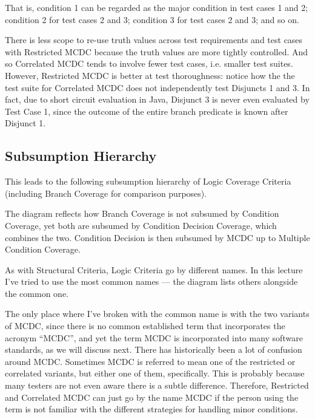 
That is, condition 1 can be regarded as the major condition in test cases
1 and 2; condition 2 for test cases 2 and 3; condition 3 for test
cases 2 and 3; and so on.

There is less scope to re-use truth values across test requirements and test
cases with Restricted MCDC because the truth values are more tightly controlled.
And so Correlated MCDC tends to involve fewer test cases, i.e. smaller test
suites. However, Restricted MCDC is better at test thoroughness: notice how the
the test suite for Correlated MCDC does not independently test Disjuncts 1 and
3. In fact, due to short circuit evaluation in Java, Disjunct 3 is never even
evaluated by Test Case 1, since the outcome of the entire branch predicate is
known after Disjunct 1.


\subsection{Subsumption Hierarchy}

This leads to the following subsumption hierarchy of Logic Coverage Criteria
(including Branch Coverage for comparison purposes).


The diagram reflects how Branch Coverage is not subsumed by Condition Coverage,
yet both are subsumed by Condition Decision Coverage, which combines the two.
Condition Decision is then subsumed by MCDC up to Multiple Condition Coverage.

As with Structural Criteria, Logic Criteria go by different names. In this
lecture I've tried to use the most common names --- the diagram lists others
alongside the common one. 

The only place where I've broken with the common name is with the two variants
of MCDC, since there is no common established term that incorporates the acronym
``MCDC'', and yet the term MCDC is incorporated into many software standards, as
we will discuss next.
%
There has historically been a lot of confusion around MCDC. Sometimes MCDC is
referred to mean one of the restricted or correlated variants, but either one of
them, specifically. This is probably because many testers are not even aware
there is a subtle difference. 
%
Therefore, Restricted and Correlated MCDC can just go by the name MCDC if the
person using the term is not familiar with the different strategies for handling
minor conditions. 

